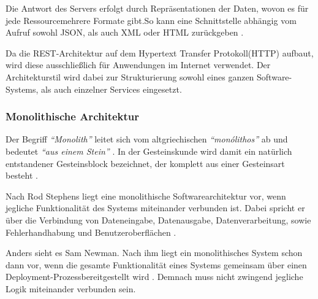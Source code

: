 Die Antwort des Servers erfolgt durch Repräsentationen der Daten, wovon es für jede Ressource\footnotemark mehrere Formate gibt.So kann eine Schnittstelle abhängig vom Aufruf sowohl JSON, als auch XML oder HTML zurückgeben \parencite[vgl.][S. 128]{starke_effektive_2015}.


 Da die REST-Architektur auf dem Hypertext Transfer Protokoll\footnotemark (HTTP) aufbaut, wird diese ausschließlich für Anwendungen im Internet verwendet. Der Architekturstil wird dabei zur Strukturierung sowohl eines ganzen Software-Systems, als auch einzelner Services eingesetzt.


\subsubsection{Monolithische Architektur}
\label{sec:monolith}

Der Begriff \textit{\enquote{Monolith}} leitet sich vom altgriechischen \textit{\enquote{monólithos}} ab und bedeutet \textit{\enquote{aus einem Stein}} \parencites[vgl.][]{duden_nodate}[vgl.][]{dwds_nodate}. In der Gesteinskunde wird damit ein natürlich entstandener Gesteinsblock bezeichnet, der komplett aus einer Gesteinsart besteht \parencite[vgl.][]{dwds_nodate}.

Nach Rod Stephens liegt eine monolithische Softwarearchitektur vor, wenn jegliche Funktionalität des Systems miteinander verbunden ist. Dabei spricht er über die Verbindung von Dateneingabe, Datenausgabe, Datenverarbeitung, sowie Fehlerhandhabung und Benutzeroberflächen \parencite[vgl.][S. 94]{stephens_beginning_2015}.

Anders sieht es Sam Newman. Nach ihm liegt ein monolithisches System schon dann vor, wenn die gesamte Funktionalität eines Systems gemeinsam über einen Deployment-Prozess\footnotemark bereitgestellt wird \parencite[vgl.][Kap. 2.2]{newman_monolith_2019}. Demnach muss nicht zwingend jegliche Logik miteinander verbunden sein.


